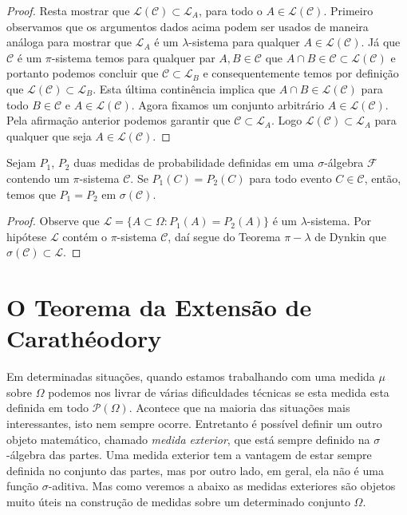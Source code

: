 \begin{proof}
    
    
    Resta mostrar que $ \mathcal{L}(\mathcal{C}) \subset  \mathcal{L}_A$, para todo o 
    $A \in  \mathcal{L}(\mathcal{C})$.
    Primeiro observamos que os argumentos dados acima podem ser usados
    de maneira análoga para mostrar que $\mathcal{L} _A$ é um $\lambda$-sistema
    para qualquer $A\in\mathcal{L}(\mathcal{C})$. 
    Já que $\mathcal{C}$ é um $\pi$-sistema temos
    para qualquer par $A,B \in \mathcal{C}$ 
    que $A \cap B \in \mathcal{C} \subset \mathcal{L}(\mathcal{C})$
    e portanto podemos concluir que $\mathcal{C} \subset\mathcal{L}_B$ 
    e consequentemente temos por definição que
    $\mathcal{L}(\mathcal{C}) \subset \mathcal{L}_B $.
    Esta última continência implica que $A\cap B\in\mathcal{L}(\mathcal{C})$
    para todo $B\in\mathcal{C}$ e $A\in\mathcal{L}(\mathcal{C})$.
    Agora fixamos um conjunto arbitrário $A\in\mathcal{L}(\mathcal{C})$.
    Pela afirmação anterior podemos garantir que 
    $\mathcal{C}\subset \mathcal{L}_{A}$. 
    Logo $\mathcal{L}(\mathcal{C}) \subset \mathcal{L}_A$
    para qualquer que seja $A\in\mathcal{L}(\mathcal{C})$. 
\end{proof}


\begin{corolario}[Unicidade]
    Sejam $P_1$, $P_2$ duas medidas de probabilidade 
    definidas em uma $\sigma$-álgebra $\mathcal{F}$ contendo um 
    $\pi$-sistema $\mathcal{C}$.
    Se $P_1(C)=P_2(C)$ para todo evento 
    $C\in\mathcal{C}$, então, temos que $P_1=P_2$ em
    $\sigma(\mathcal{C})$.
\end{corolario}

\begin{proof}
    Observe que $\mathcal{L}  = \{A \subset \Omega: P_1(A) = P_2(A)\}$  é um $\lambda$-sistema. 
    Por hipótese $\mathcal{L}$ contém o $\pi$-sistema $\mathcal{C}$, daí
    segue do Teorema $\pi-\lambda$ de Dynkin que $\sigma(\mathcal{C}) \subset \mathcal{L}$.
\end{proof}

\section{O Teorema da Extensão de Carathéodory}


Em determinadas situações, quando estamos trabalhando 
com uma medida $\mu$ sobre $\Omega$ podemos nos livrar de várias 
dificuldades técnicas se esta medida esta definida
em todo $\mathcal{P}(\Omega)$. Acontece que na maioria das situações mais 
interessantes, isto nem sempre ocorre. Entretanto é possível definir um outro objeto 
matemático, chamado {\it medida exterior}, que está sempre definido na 
$\sigma$-álgebra das partes.
Uma medida exterior tem a vantagem de estar sempre 
definida no conjunto das partes, mas por outro lado, em geral, 
ela não é uma função $\sigma$-aditiva. 
Mas como veremos a abaixo as medidas exteriores são objetos muito 
úteis na construção de medidas sobre um determinado conjunto $\Omega$.



